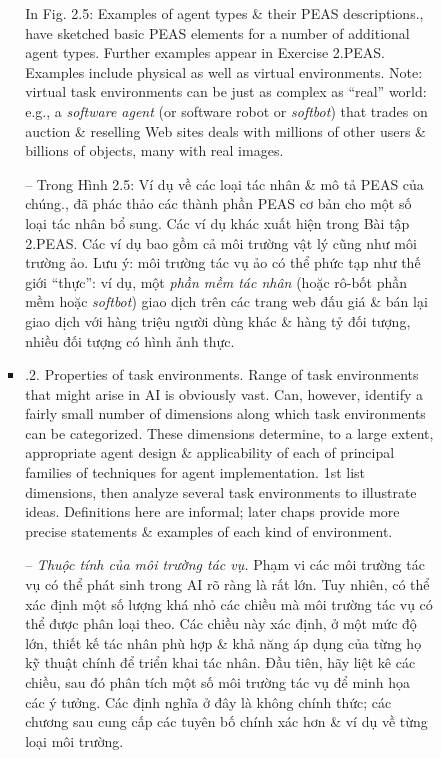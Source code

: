 \documentclass{article}
\begin{document}
\begin{itemize}
\begin{itemize}
\begin{itemize}
\begin{itemize}
				In {\sf Fig. 2.5: Examples of agent types \& their PEAS descriptions.}, have sketched basic PEAS elements for a number of additional agent types. Further examples appear in Exercise 2.PEAS. Examples include physical as well as virtual environments. Note: virtual task environments can be just as complex as ``real'' world: e.g., a {\it software agent} (or software robot or {\it softbot}) that trades on auction \& reselling Web sites deals with millions of other users \& billions of objects, many with real images.
				
				-- Trong {\sf Hình 2.5: Ví dụ về các loại tác nhân \& mô tả PEAS của chúng.}, đã phác thảo các thành phần PEAS cơ bản cho một số loại tác nhân bổ sung. Các ví dụ khác xuất hiện trong Bài tập 2.PEAS. Các ví dụ bao gồm cả môi trường vật lý cũng như môi trường ảo. Lưu ý: môi trường tác vụ ảo có thể phức tạp như thế giới ``thực'': ví dụ, một {\it phần mềm tác nhân} (hoặc rô-bốt phần mềm hoặc {\it softbot}) giao dịch trên các trang web đấu giá \& bán lại giao dịch với hàng triệu người dùng khác \& hàng tỷ đối tượng, nhiều đối tượng có hình ảnh thực.				
				\item {.2. Properties of task environments.} Range of task environments that might arise in AI is obviously vast. Can, however, identify a fairly small number of dimensions along which task environments can be categorized. These dimensions determine, to a large extent, appropriate agent design \& applicability of each of principal families of techniques for agent implementation. 1st list dimensions, then analyze several task environments to illustrate ideas. Definitions here are informal; later chaps provide more precise statements \& examples of each kind of environment.
				
				-- {\it Thuộc tính của môi trường tác vụ.} Phạm vi các môi trường tác vụ có thể phát sinh trong AI rõ ràng là rất lớn. Tuy nhiên, có thể xác định một số lượng khá nhỏ các chiều mà môi trường tác vụ có thể được phân loại theo. Các chiều này xác định, ở một mức độ lớn, thiết kế tác nhân phù hợp \& khả năng áp dụng của từng họ kỹ thuật chính để triển khai tác nhân. Đầu tiên, hãy liệt kê các chiều, sau đó phân tích một số môi trường tác vụ để minh họa các ý tưởng. Các định nghĩa ở đây là không chính thức; các chương sau cung cấp các tuyên bố chính xác hơn \& ví dụ về từng loại môi trường.
				

\end{itemize}
\end{itemize}
\end{itemize}
\end{itemize}
\end{document}
